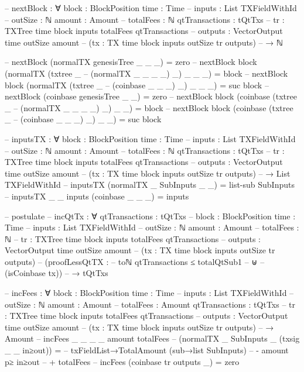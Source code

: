 \documentclass{beamer}
\begin{document}
{\begin{code}
--         nextBlock : ∀ {block : BlockPosition} {time : Time}
--           {inputs : List TXFieldWithId}
--           {outSize : ℕ} {amount : Amount}
--           {totalFees : ℕ} {qtTransactions : tQtTxs}
--           {tr : TXTree time block inputs totalFees qtTransactions}
--           {outputs : VectorOutput time outSize amount}
--           (tx : TX {time} {block} {inputs} {outSize} tr outputs)
--           → ℕ

--         nextBlock (normalTX genesisTree _ _ _) = zero
--         nextBlock {block} (normalTX (txtree _
--           (normalTX _ _ _ _) _) _ _ _) = block
--         nextBlock {block} (normalTX (txtree _
--           (coinbase _ _ _) _) _ _ _) = suc block
--         nextBlock (coinbase genesisTree _ _) = zero
--         nextBlock {block} (coinbase (txtree _
--           (normalTX _ _ _ _) _) _ _) = block
--         nextBlock {block} (coinbase (txtree _
--           (coinbase _ _ _) _) _ _) = suc block

--         inputsTX : ∀ {block : BlockPosition} {time : Time}
--           {inputs : List TXFieldWithId}
--           {outSize : ℕ} {amount : Amount}
--           {totalFees : ℕ} {qtTransactions : tQtTxs}
--           {tr : TXTree time block inputs totalFees qtTransactions}
--           {outputs : VectorOutput time outSize amount}
--           (tx : TX {time} {block} {inputs} {outSize} tr outputs)
--           → List TXFieldWithId
--         inputsTX (normalTX _ SubInputs _ _) = list-sub SubInputs
--         inputsTX {_} {_} {inputs} (coinbase _ _ _) = inputs

--         postulate
--           incQtTx : ∀ {qtTransactions : tQtTxs}
--             {block : BlockPosition} {time : Time}
--             {inputs : List TXFieldWithId}
--             {outSize : ℕ} {amount : Amount}
--             {totalFees : ℕ}
--             {tr : TXTree time block inputs totalFees qtTransactions}
--             {outputs : VectorOutput time outSize amount}
--             (tx : TX {time} {block} {inputs} {outSize} tr outputs)
--             (proofLessQtTX :
--                 toℕ qtTransactions ≤ totalQtSub1
--                 ⊎
--                 (isCoinbase tx))
--             → tQtTxs

--         incFees : ∀ {block : BlockPosition} {time : Time}
--           {inputs : List TXFieldWithId}
--           {outSize : ℕ} {amount : Amount}
--           {totalFees : Amount} {qtTransactions : tQtTxs}
--           {tr : TXTree time block inputs totalFees qtTransactions}
--           {outputs : VectorOutput time outSize amount}
--           (tx : TX {time} {block} {inputs} {outSize} tr outputs)
--           → Amount
--         incFees {_} {_} {_} {_} {amount} {totalFees}
--           (normalTX _ SubInputs _ (txsig _ _ in≥out)) =
--           txFieldList→TotalAmount (sub→list SubInputs)
--           - amount p≥ in≥out
--           + totalFees
--         incFees (coinbase tr outputs _) = zero


\end{code}}
\end{document}
